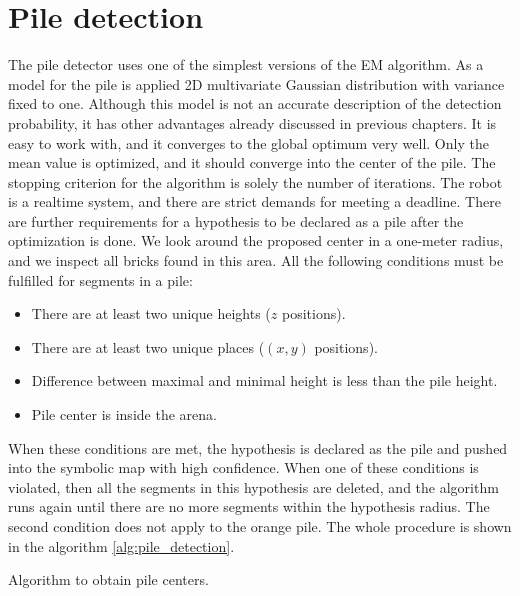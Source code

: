 \section{Pile detection}
The pile detector uses one of the simplest versions of the EM algorithm. As a model for the pile is applied 2D multivariate Gaussian distribution with variance fixed to one. Although this model is not an accurate description of the detection probability, it has other advantages already discussed in previous chapters. It is easy to work with, and it converges to the global optimum very well. Only the mean value is optimized, and it should converge into the center of the pile. The stopping criterion for the algorithm is solely the number of iterations. The robot is a realtime system, and there are strict demands for meeting a deadline. There are further requirements for a hypothesis to be declared as a pile after the optimization is done. We look around the proposed center in a one-meter radius, and we inspect all bricks found in this area. All the following conditions must be fulfilled for segments in a pile:
\begin{itemize}
\item There are at least two unique heights ($z$ positions).
\item There are at least two unique places ($(x,y)$ positions).
\item Difference between maximal and minimal height is less than the pile height.
\item Pile center is inside the arena.
\end{itemize}
When these conditions are met, the hypothesis is declared as the pile and pushed into the symbolic map with high confidence. When one of these conditions is violated, then all the segments in this hypothesis are deleted, and the algorithm runs again until there are no more segments within the hypothesis radius. The second condition does not apply to the orange pile. The whole procedure is shown in the algorithm \ref{alg:pile_detection}.
\begin{algorithm}[]
 \caption{Algorithm to obtain pile centers.}
 \label{alg:pile_detection}
\end{algorithm}

